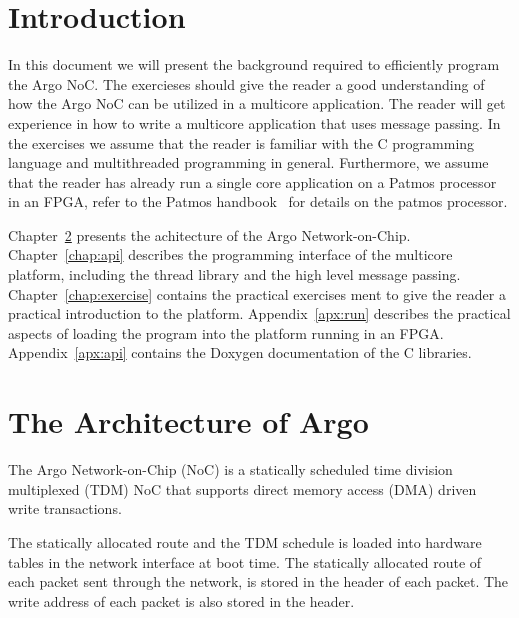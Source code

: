 \documentclass[a4paper,fontsize=10pt,twoside,DIV15,BCOR12mm,headinclude=true,footinclude=false,pagesize,bibtotoc]{scrbook}
\begin{document}
\mainmatter

\chapter{Introduction}

In this document we will present the background required to efficiently program the Argo NoC.
The exercieses should give the reader a good understanding of how the Argo NoC can be utilized in a multicore application.
The reader will get experience in how to write a multicore application that uses message passing.
In the exercises we assume that the reader is familiar with the C programming language and multithreaded programming in general.
Furthermore, we assume that the reader has already run a single core application on a Patmos processor in an FPGA, refer to the Patmos handbook~\cite{patmos-handbook} for details on the patmos processor.


Chapter~\ref{chap:arch} presents the achitecture of the Argo Network-on-Chip.
Chapter~\ref{chap:api} describes the programming interface of the multicore platform, including the thread library and the high level message passing.
Chapter~\ref{chap:exercise} contains the practical exercises ment to give the reader a practical introduction to the platform.
Appendix~\ref{apx:run} describes the practical aspects of loading the program into the platform running in an FPGA.
Appendix~\ref{apx:api} contains the Doxygen documentation of the C libraries.


\chapter{The Architecture of Argo}
\label{chap:arch}
The Argo Network-on-Chip (NoC) is a statically scheduled
time division multiplexed (TDM) NoC that supports
direct memory access (DMA) driven write transactions.

The statically allocated route and the TDM schedule is loaded
into hardware tables in the network interface at boot time.
The statically allocated route of each packet sent through the
network, is stored in the header of each packet.
The write address of each packet is also stored in the header.
\end{document}

